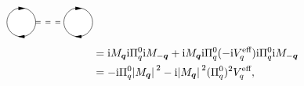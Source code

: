 \begin{equation}
\begin{aligned}
\begin{gathered}
\begin{tikzpicture}[x=0.75pt,y=0.75pt,yscale=-0.7,xscale=0.7]
                \draw  [fill={rgb, 255:red, 255; green, 255; blue, 255 }  ,fill opacity=1 ] (114,120) .. controls (114,106.19) and (125.19,95) .. (139,95) .. controls (152.81,95) and (164,106.19) .. (164,120) .. controls (164,133.81) and (152.81,145) .. (139,145) .. controls (125.19,145) and (114,133.81) .. (114,120) -- cycle ;
                \draw    (146,96) ;
                \draw [shift={(146,96)}, rotate = 180] [fill={rgb, 255:red, 0; green, 0; blue, 0 }  ][line width=0.08]  [draw opacity=0] (12,-3) -- (0,0) -- (12,3) -- cycle    ;
                \draw    (140,145) -- (134.71,145) ;
                \draw [shift={(132.71,145)}, rotate = 360] [fill={rgb, 255:red, 0; green, 0; blue, 0 }  ][line width=0.08]  [draw opacity=0] (12,-3) -- (0,0) -- (12,3) -- cycle    ;
                \draw  [fill={rgb, 255:red, 255; green, 255; blue, 255 }  ,fill opacity=1 ] (213,120) .. controls (213,106.19) and (224.19,95) .. (238,95) .. controls (251.81,95) and (263,106.19) .. (263,120) .. controls (263,133.81) and (251.81,145) .. (238,145) .. controls (224.19,145) and (213,133.81) .. (213,120) -- cycle ;
                \draw    (245,96) ;
                \draw [shift={(245,96)}, rotate = 180] [fill={rgb, 255:red, 0; green, 0; blue, 0 }  ][line width=0.08]  [draw opacity=0] (12,-3) -- (0,0) -- (12,3) -- cycle    ;
                \draw    (239,145) -- (233.71,145) ;
                \draw [shift={(231.71,145)}, rotate = 360] [fill={rgb, 255:red, 0; green, 0; blue, 0 }  ][line width=0.08]  [draw opacity=0] (12,-3) -- (0,0) -- (12,3) -- cycle    ;
                \draw  [dash pattern={on 4.5pt off 4.5pt}]  (164,118.5) -- (213,118.5)(164,121.5) -- (213,121.5) ;
                \end{tikzpicture}            
        \end{gathered} \\
        &= \ii M_{\vb*{q}} \ii \Pi^0_q \ii M_{- \vb*{q}} + \ii M_{\vb*{q}} \ii \Pi^0_q (- \ii V^\text{eff}_q) \ii \Pi^0_q \ii M_{- \vb*{q}} \\ 
        &= - \ii \Pi^0_q \abs*{M_{\vb*{q}}}^2 - \ii \abs*{M_{\vb*{q}}}^2 (\Pi^0_q)^2 V^\text{eff}_q,
    \end{aligned}
\end{equation}